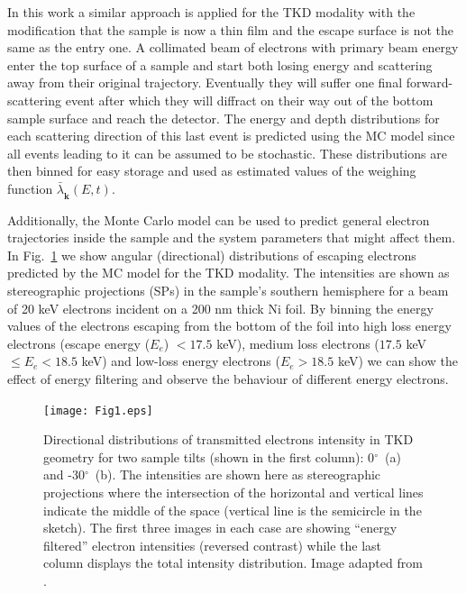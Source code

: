In this work a similar approach is applied for the TKD modality with the modification that the sample is now a thin film and the escape surface is not the same as the entry one. A collimated beam of electrons with primary beam energy enter the top surface of a sample and start both losing energy and scattering away from their original trajectory. Eventually they will suffer one final forward-scattering event after which they will diffract on their way out of the bottom sample surface and reach the detector. The energy and depth distributions for each scattering direction of this last event is predicted using the MC model since all events leading to it can be assumed to be stochastic. These distributions are then binned for easy storage and used as estimated values of the weighing function $\bar{\lambda}_{\hat{\mathbf{k}}}(E,t)$.


Additionally, the Monte Carlo model can be used to predict general electron trajectories inside the sample and the system parameters that might affect them. In Fig.~\ref{fig:SP_TKD} we show angular (directional) distributions of escaping electrons predicted by the MC model for the TKD modality. The intensities are shown as stereographic projections (SPs) in the sample's southern hemisphere for a beam of 20 keV electrons incident on a 200 nm thick Ni foil. By binning the energy values of the electrons escaping from the bottom of the foil into high loss energy electrons (escape energy ($E_e$) $<17.5$ keV), medium loss electrons ($17.5$ keV $\leqslant E_e < 18.5$ keV) and low-loss energy electrons ($E_e>18.5$ keV) we can show the effect of energy filtering and observe the behaviour of different energy electrons. 



\begin{figure}[ht]
\centering\leavevmode
\texttt{[image: Fig1.eps]} %
\caption[Directional distributions of transmitted electrons intensity in TKD geometry.]{Directional distributions of transmitted electrons intensity in TKD geometry for two sample tilts (shown in the first column): 0$^{\circ}$~(a) and -30$^{\circ}$~(b). The intensities are shown here as stereographic projections where the intersection of the horizontal and vertical lines indicate the middle of the space (vertical line is the semicircle in the sketch). The first three images in each case are showing  ``energy filtered'' electron intensities (reversed contrast) while the last column displays the total intensity distribution. Image adapted from \cite{PascalTKD}. } 
\label{fig:SP_TKD}
\end{figure}


